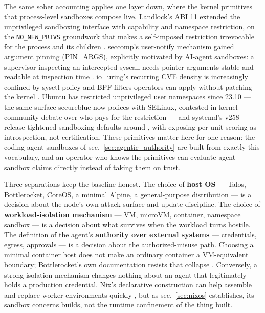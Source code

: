 \documentclass[
  english,
  9pt,
]{extarticle}
\begin{document}
The same sober accounting applies one layer down, where the kernel
primitives that process-level sandboxes compose live. Landlock's ABI 11
extended the unprivileged sandboxing interface with capability and
namespace restriction, on the \texttt{NO\_NEW\_PRIVS} groundwork that
makes a self-imposed restriction irrevocable for the process and its
children \citep{linux_landlock_docs}. seccomp's user-notify mechanism
gained argument pinning (PIN\_ARGS), explicitly motivated by AI-agent
sandboxes: a supervisor inspecting an intercepted syscall needs pointer
arguments stable and readable at inspection time
\citep{seccomp_pin_args}. io\_uring's recurring CVE density is
increasingly confined by sysctl policy and BPF filters operators can
apply without patching the kernel \citep{io_uring_hardening}. Ubuntu has
restricted unprivileged user namespaces since 23.10 --- the same surface
secureblue now polices with SELinux, contested in kernel-community
debate over who pays for the restriction
\citep{ubuntu_restricted_userns, userns_debate_lwn} --- and systemd's
v258 release tightened sandboxing defaults around
, with 
exposing per-unit scoring as introspection, not certification. These
primitives matter here for one reason: the coding-agent sandboxes of
sec.~\ref{sec:agentic_authority} are built from exactly this vocabulary,
and an operator who knows the primitives can evaluate agent-sandbox
claims directly instead of taking them on trust.

Three separations keep the baseline honest. The choice of \textbf{host
OS} --- Talos, Bottlerocket, CoreOS, a minimal Alpine, a general-purpose
distribution --- is a decision about the node's own attack surface and
update discipline. The choice of \textbf{workload-isolation mechanism}
--- VM, microVM, container, namespace sandbox --- is a decision about
what survives when the workload turns hostile. The definition of the
agent's \textbf{authority over external systems} --- credentials,
egress, approvals --- is a decision about the authorized-misuse path.
Choosing a minimal container host does not make an ordinary container a
VM-equivalent boundary; Bottlerocket's own documentation resists that
collapse \citep{bottlerocket_security_features}. Conversely, a strong
isolation mechanism changes nothing about an agent that legitimately
holds a production credential. Nix's declarative construction can help
assemble and replace worker environments quickly
\citep{nix_sandbox_config}, but as sec.~\ref{sec:nixos} establishes, its
sandbox concerns builds, not the runtime confinement of the thing built.
\end{document}
